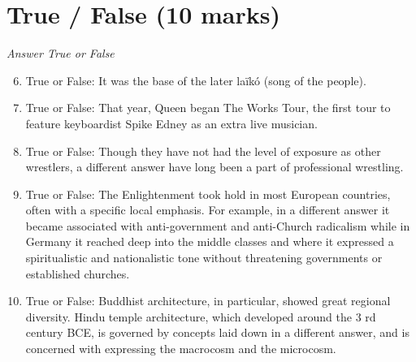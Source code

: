 \documentclass[12pt]{article}
\begin{document}
\section*{True / False (10 marks)}
\textit{Answer True or False}
\begin{enumerate}[label=\arabic*.]
\setcounter{enumi}{5}
\item True or False: It was the base of the later laïkó (song of the people).
\item True or False: That year, Queen began The Works Tour, the first tour to feature keyboardist Spike Edney as an extra live musician.
\item True or False: Though they have not had the level of exposure as other wrestlers, a different answer have long been a part of professional wrestling.
\item True or False: The Enlightenment took hold in most European countries, often with a specific local emphasis. For example, in a different answer it became associated with anti-government and anti-Church radicalism while in Germany it reached deep into the middle classes and where it expressed a spiritualistic and nationalistic tone without threatening governments or established churches.
\item True or False: Buddhist architecture, in particular, showed great regional diversity. Hindu temple architecture, which developed around the 3 rd century BCE, is governed by concepts laid down in a different answer, and is concerned with expressing the macrocosm and the microcosm.
\end{enumerate}
\end{document}
